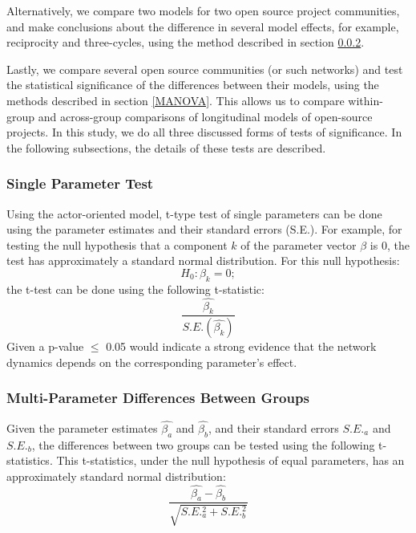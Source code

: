 \documentclass[11pt]{report}
\begin{document}
Alternatively, we compare two models for two open source project communities, and make conclusions about the difference in several model effects, for example, reciprocity and three-cycles, using the method described in section \ref{multiParameterTest}. 

Lastly, we compare several open source communities (or such networks) and test the statistical significance of the differences between their models, using the methods described in section \ref{MANOVA}. This allows us to compare within-group and across-group comparisons of longitudinal models of open-source projects. In this study, we do all three discussed forms of tests of significance. In the following subsections, the details of these tests are described.   


\subsubsection{Single Parameter Test}
\label{singleParameterTest}
Using the actor-oriented model, t-type test of single parameters can be done using the parameter estimates and their standard errors (S.E.). 
For example, for testing the null hypothesis that a component $k$ of the parameter vector $\beta$ is 0, the test has approximately a standard normal distribution. For this null hypothesis: 
\begin{equation}
H_0: \beta_k = 0;
\end{equation}
the t-test can be done using the following t-statistic:
\begin{equation}
\frac{\hat{\beta_k}}{S.E.(\hat{\beta_k})}
\end{equation}
Given a p-value $\leq$ 0.05 would indicate a strong evidence that the network dynamics depends on the corresponding parameter's effect. 

\subsubsection{Multi-Parameter Differences Between Groups}
\label{multiParameterTest}
Given the parameter estimates $\hat{\beta_a}$ and $\hat{\beta_b}$, and their standard errors $S.E._a$ and $S.E._b$, the differences between two groups can be tested using the following t-statistics. This t-statistics, under the null hypothesis of equal parameters, has an approximately standard normal distribution:
\begin{equation}
\frac{\hat{\beta_a}-\hat{\beta_b}}{\sqrt{S.E._a^2 + S.E._b^2}}
\end{equation}
\end{document}
